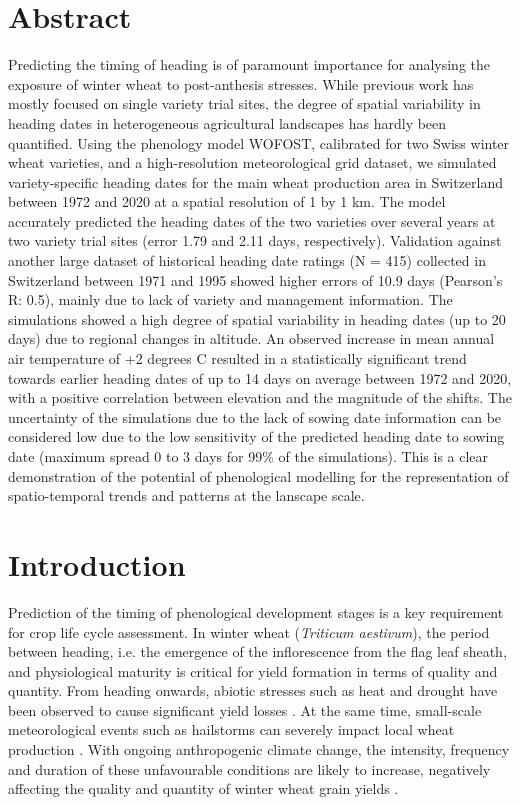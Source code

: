 \section*{Abstract}
Predicting the timing of heading is of paramount importance for analysing the exposure of winter wheat to post-anthesis stresses. While previous work has mostly focused on single variety trial sites, the degree of spatial variability in heading dates in heterogeneous agricultural landscapes has hardly been quantified. 
Using the phenology model WOFOST, calibrated for two Swiss winter wheat varieties, and a high-resolution meteorological grid dataset, we simulated variety-specific heading dates for the main wheat production area in Switzerland between 1972 and 2020 at a spatial resolution of 1 by 1 km. The model accurately predicted the heading dates of the two varieties over several years at two variety trial sites (error 1.79 and 2.11 days, respectively). Validation against another large dataset of historical heading date ratings (N = 415) collected in Switzerland between 1971 and 1995 showed higher errors of 10.9 days (Pearson's R: 0.5), mainly due to lack of variety and management information. The simulations showed a high degree of spatial variability in heading dates (up to 20 days) due to regional changes in altitude. An observed increase in mean annual air temperature of +2 degrees C resulted in a statistically significant trend towards earlier heading dates of up to 14 days on average between 1972 and 2020, with a positive correlation between elevation and the magnitude of the shifts. The uncertainty of the simulations due to the lack of sowing date information can be considered low due to the low sensitivity of the predicted heading date to sowing date (maximum spread 0 to 3 days for 99\% of the simulations). This is a clear demonstration of the potential of phenological modelling for the representation of spatio-temporal trends and patterns at the lanscape scale.

\section{Introduction}
Prediction of the timing of phenological development stages is a key requirement for crop life cycle assessment. In winter wheat (\textsl{Triticum aestivum}), the period between heading, i.e. the emergence of the inflorescence from the flag leaf sheath, and physiological maturity is critical for yield formation in terms of quality and quantity. From heading onwards, abiotic stresses such as heat and drought have been observed to cause significant yield losses \citep{porter_temperatures_1999, barlow_simulating_2015, rezaei_heat_2015}. At the same time, small-scale meteorological events such as hailstorms can severely impact local wheat production \citep{holman_impact_2022}. With ongoing anthropogenic climate change, the intensity, frequency and duration of these unfavourable conditions are likely to increase, negatively affecting the quality and quantity of winter wheat grain yields \citep{asseng_climate_2019, bonecke_decoupling_2020, pequeno_climate_2021, zhang_climate_2022}.

